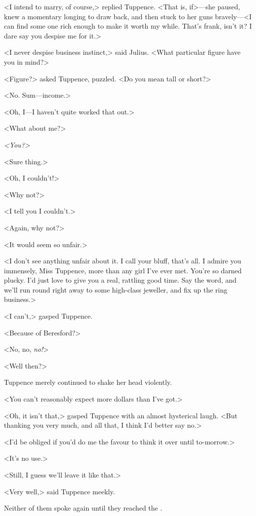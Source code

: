 <I intend to marry, of course,> replied Tuppence. <That is, if>—she paused, knew a momentary longing to draw back, and then stuck to her guns bravely—<I can find some one rich enough to make it worth my while. That's frank, isn't it? I dare say you despise me for it.>

<I never despise business instinct,> said Julius. <What particular figure have you in mind?>

<Figure?> asked Tuppence, puzzled. <Do you mean tall or short?>

<No. Sum—income.>

<Oh, I—I haven't quite worked that out.>

<What about me?>

\emph{<You?>}

<Sure thing.>

<Oh, I couldn't!>

<Why not?>

<I tell you I couldn't.>

<Again, why not?>

<It would seem so unfair.>

<I don't see anything unfair about it. I call your bluff, that's all. I admire you immensely, Miss Tuppence, more than any girl I've ever met. You're so darned plucky. I'd just love to give you a real, rattling good time. Say the word, and we'll run round right away to some high-class jeweller, and fix up the ring business.>

<I can't,> gasped Tuppence.

<Because of Beresford?>

<No, no, \emph{no!}>

<Well then?>

Tuppence merely continued to shake her head violently.

<You can't reasonably expect more dollars than I've got.>

<Oh, it isn't that,> gasped Tuppence with an almost hysterical laugh. <But thanking you very much, and all that, I think I'd better say no.>

<I'd be obliged if you'd do me the favour to think it over until to-morrow.>

<It's no use.>

<Still, I guess we'll leave it like that.>

<Very well,> said Tuppence meekly.

Neither of them spoke again until they reached the .

